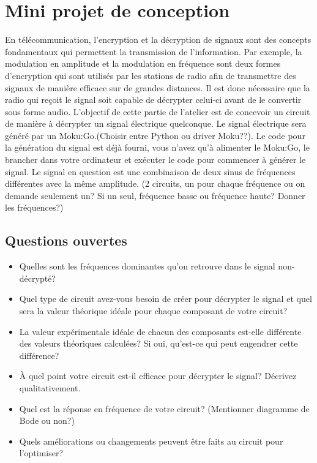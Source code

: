 \documentclass[canadien,12pt,oneside,letterpaper]{article}
\begin{document}
\section{Mini projet de conception}\label{sec:projet}
En télécommunication, l'encryption et la décryption de signaux sont des concepts fondamentaux qui permettent la transmission de l'information. Par exemple, la modulation en amplitude et la modulation en fréquence sont deux formes d'encryption qui sont utilisés par les stations de radio afin de transmettre des signaux de manière efficace sur de grandes distances. Il est donc nécessaire que la radio qui reçoit le signal soit capable de décrypter celui-ci avant de le convertir sous forme audio. L'objectif de cette partie de l'atelier est de concevoir un circuit de manière à décrypter un signal électrique quelconque. Le signal électrique sera généré par un Moku:Go.(Choisir entre Python ou driver Moku??). Le code pour la génération du signal est déjà fourni, vous n'avez qu'à alimenter le Moku:Go, le brancher dans votre ordinateur et exécuter le code pour commencer à générer le signal. Le signal en question est une combinaison de deux sinus de fréquences différentes avec la même amplitude. (2 circuits, un pour chaque fréquence ou on demande seulement un? Si un seul, fréquence basse ou fréquence haute? Donner les fréquences?)

\subsection{Questions ouvertes}
\begin{itemize}
    \item Quelles sont les fréquences dominantes qu'on retrouve dans le signal non-décrypté?
    \item Quel type de circuit avez-vous besoin de créer pour décrypter le signal et quel sera la valeur théorique idéale pour chaque composant de votre circuit? 
    \item La valeur expérimentale idéale de chacun des composants est-elle différente des valeurs théoriques calculées? Si oui, qu'est-ce qui peut engendrer cette différence?
    \item À quel point votre circuit est-il efficace pour décrypter le signal? Décrivez qualitativement. 
    \item Quel est la réponse en fréquence de votre circuit? (Mentionner diagramme de Bode ou non?)
    \item Quels améliorations ou changements peuvent être faits au circuit pour l'optimiser? 
\end{itemize}
\end{document}
